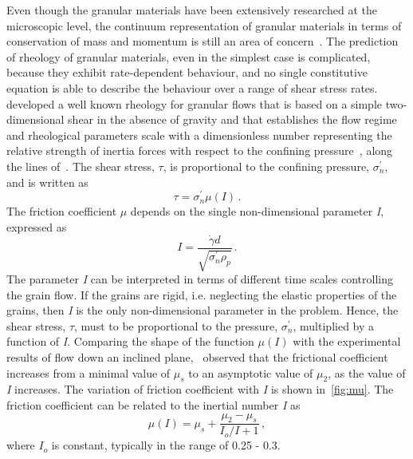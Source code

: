 Even though the granular materials have been extensively researched at 
the microscopic level, the continuum representation of granular materials in 
terms of conservation of mass and momentum is still an area of 
concern~\citep{Midi2004,Daniel2007}. The prediction of rheology of granular 
materials, even in the simplest case is complicated, because they exhibit 
rate-dependent behaviour, and no single constitutive equation is able to 
describe the behaviour over a range of shear stress rates.~\citet{DaCruz2005} 
developed a well known rheology for granular flows that is based on a
simple two-dimensional shear in the absence of gravity and that establishes 
the flow regime and rheological parameters scale with a dimensionless 
number representing the relative strength of inertia forces with respect to the 
confining pressure~\citep{Daniel2007}, along the lines of~\citet{Savage1991}. 
The shear stress, $\tau$, is proportional to the confining pressure, 
$\sigma_n^\prime$, and is written as
%
\begin{equation}
\tau = \sigma_n^\prime \mu (\mathit{I}) \,.
\end{equation}
%
The friction coefficient $\mu$ depends on the single non-dimensional parameter 
\textit{I}, expressed as
\begin{equation}
\textit{I} = \frac{\dot{\gamma}d}{\sqrt{ \sigma_n^\prime\rho_{\mathit{p}}}} \,.
\end{equation}
%
The parameter \textit{I} can be interpreted in terms of different time scales 
controlling the grain flow. If the grains are rigid, i.e. neglecting the 
elastic properties of the grains, then \textit{I} is the only 
non-dimensional parameter in the problem. Hence, the shear stress, $\tau$, must 
to be proportional to the pressure, $\sigma_n^\prime$, multiplied by a function 
of \textit{I}. Comparing the shape of the function $\mu(\mathit{I})$ with the 
experimental results of flow down an inclined plane,~\citet{Jop2006} observed 
that the frictional coefficient increases from a minimal value of 
$\mu_{\mathit{s}}$ to an asymptotic value of $\mu_{2}$, as the value of 
\textit{I} increases. The variation of friction coefficient with \textit{I} is 
shown in~\cref{fig:mu}. The friction coefficient can be related to the inertial 
number \textit{I} as
%
\begin{equation}
\mu(I) = \mu_s + \frac{\mu_2 - \mu_s}{I_o/I+1} \,,
\end{equation}
%
where $I_o$ is constant, typically in the range of 0.25 - 0.3. 

